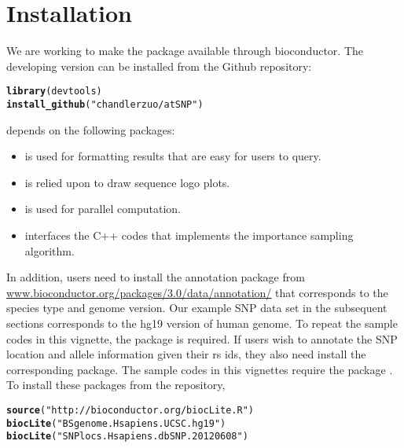 \documentclass[a4paper,10pt]{article}\usepackage[]{graphicx}\usepackage[]{color}
\makeatletter
\newcommand{\hlstr}[1]{\textcolor[rgb]{0.192,0.494,0.8}{#1}}%
\newcommand{\hlstd}[1]{\textcolor[rgb]{0.345,0.345,0.345}{#1}}%
\newcommand{\hlkwd}[1]{\textcolor[rgb]{0.737,0.353,0.396}{\textbf{#1}}}%
\newenvironment{kframe}{%
 \def\at@end@of@kframe{}%
 \ifinner\ifhmode%
  \def\at@end@of@kframe{\end{minipage}}%
  \begin{minipage}{\columnwidth}%
 \fi\fi%
 \def\FrameCommand##1{\hskip\@totalleftmargin \hskip-\fboxsep
 \colorbox{shadecolor}{##1}\hskip-\fboxsep
     \hskip-\linewidth \hskip-\@totalleftmargin \hskip\columnwidth}%
 \MakeFramed {\advance\hsize-\width
   \@totalleftmargin\z@ \linewidth\hsize
   \@setminipage}}%
 {\par\unskip\endMakeFramed%
 \at@end@of@kframe}
\newenvironment{knitrout}{}{} %
\makeatother
\begin{document}
\section{Installation}

We are working to make the package available through bioconductor. The developing version can be installed from the Github repository:

\begin{knitrout}
\color{fgcolor}\begin{kframe}
\begin{alltt}
\hlkwd{library}\hlstd{(devtools)}
\hlkwd{install_github}\hlstd{(}\hlstr{"chandlerzuo/atSNP"}\hlstd{)}
\end{alltt}
\end{kframe}
\end{knitrout}

 depends on the following \R{} packages:

\begin{itemize}
\item {} is used for formatting results that are easy for users to query.
\item {} is relied upon to draw sequence logo plots.
\item {} is used for parallel computation.
\item {} interfaces the C++ codes that implements the importance sampling algorithm.
\end{itemize}
  
In addition, users need to install the annotation package  from \url{www.bioconductor.org/packages/3.0/data/annotation/} that corresponds to the species type and genome version. Our example SNP data set in the subsequent sections corresponds to the hg19 version of human genome. To repeat the sample codes in this vignette, the  package is required. If users wish to annotate the SNP location and allele information given their rs ids, they also need install the corresponding  package. The sample codes in this vignettes require the package . To install these packages from the \Bioconductor{} repository,

\begin{knitrout}
\color{fgcolor}\begin{kframe}
\begin{alltt}
  \hlkwd{source}\hlstd{(}\hlstr{"http://bioconductor.org/biocLite.R"}\hlstd{)}
  \hlkwd{biocLite}\hlstd{(}\hlstr{"BSgenome.Hsapiens.UCSC.hg19"}\hlstd{)}
  \hlkwd{biocLite}\hlstd{(}\hlstr{"SNPlocs.Hsapiens.dbSNP.20120608"}\hlstd{)}
\end{alltt}
\end{kframe}
\end{knitrout}
\end{document}
